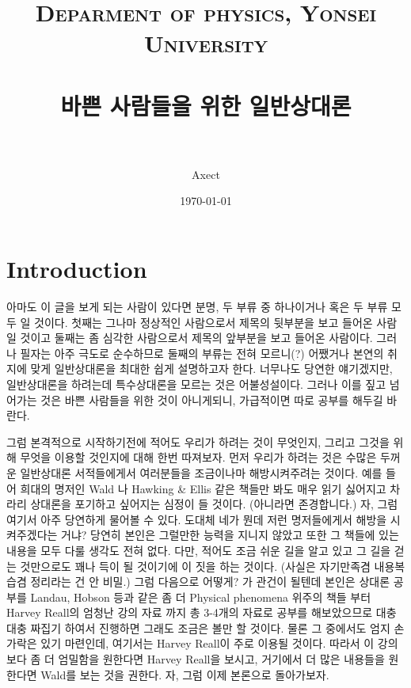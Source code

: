 \documentclass[paper=a4, fontsize=11pt]{scrartcl} %
\title{	
\normalfont \normalsize 
\textsc{Deparment of physics, Yonsei University} \\ [25pt] %
\horrule{0.5pt} \\[0.4cm] %
\huge 바쁜 사람들을 위한 일반상대론 \\ %
\horrule{2pt} \\[0.5cm] %
}
\author{Axect} %
\date{\normalsize\today} %
\numberwithin{equation}{section} %
\numberwithin{figure}{section} %
\numberwithin{table}{section} %
\theoremstyle{plain}
\newcommand{\HS}{\hspace{0.5cm}}
\begin{document}
\maketitle %


\section{Introduction}

\onehalfspacing
\HS 아마도 이 글을 보게 되는 사람이 있다면 분명, 두 부류 중 하나이거나 혹은 두 부류 모두 일 것이다. 첫째는 그나마 정상적인 사람으로서 제목의 뒷부분을 보고 들어온 사람일 것이고 둘째는 좀 심각한 사람으로서 제목의 앞부분을 보고 들어온 사람이다.
그러나 필자는 아주 극도로 순수하므로 둘째의 부류는 전혀 모르니(?) 어쨌거나 본연의 취지에 맞게 일반상대론을 최대한 쉽게 설명하고자 한다. \footnotemark
{}
너무나도 당연한 얘기겠지만, 일반상대론을 하려는데 특수상대론을 모르는 것은 어불성설이다. 그러나 이를 짚고 넘어가는 것은 바쁜 사람들을 위한 것이 아니게되니, 가급적이면 따로 공부를 해두길 바란다.\footnotemark
{}

\vspace{0.3cm}

\HS 그럼 본격적으로 시작하기전에 적어도 우리가 하려는 것이 무엇인지, 그리고 그것을 위해 무엇을 이용할 것인지에 대해 한번 따져보자. 먼저 우리가 하려는 것은 
수많은 두꺼운 일반상대론 서적들에게서 여러분들을 조금이나마 해방시켜주려는 것이다. 예를 들어 희대의 명저인 Wald 나 Hawking \& Ellis 같은 책들만 봐도 
매우 읽기 싫어지고 차라리 상대론을 포기하고 싶어지는 심정이 들 것이다. (아니라면 존경합니다.) 자, 그럼 여기서 아주 당연하게 물어볼 수 있다. 도대체 네가 뭔데 
저런 명저들에게서 해방을 시켜주겠다는 거냐? 당연히 본인은 그럴만한 능력을 지니지 않았고 또한 그 책들에 있는 내용을 모두 다룰 생각도 전혀 없다. 다만, 적어도 
조금 쉬운 길을 알고 있고 그 길을 걷는 것만으로도 꽤나 득이 될 것이기에 이 짓을 하는 것이다. (사실은 자기만족겸 내용복습겸 정리라는 건 안 비밀.)  그럼 다음으로 어떻게? 가 관건이 될텐데 본인은 상대론 공부를 Landau, Hobson
 등과 같은 좀 더 Physical phenomena 위주의 책들 부터 Harvey Reall의 엄청난 강의 자료 까지 총 3-4개의 자료로 공부를 해보았으므로 대충대충 짜집기 하여서 
 진행하면 그래도 조금은 볼만 할 것이다. 물론 그 중에서도 엄지 손가락은 있기 마련인데, 여기서는 Harvey Reall이 주로 이용될 것이다.\footnotemark
 따라서 이 강의보다 좀 더 엄밀함을 원한다면 Harvey Reall을 보시고, 거기에서 더 많은 내용들을 원한다면 Wald를 보는 것을 권한다. 자, 그럼 이제 본론으로 돌아가보자.
 
\end{document}

